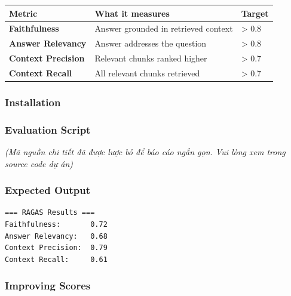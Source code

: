 \begingroup
\small
\setlength{\tabcolsep}{3pt}
\renewcommand{\arraystretch}{1.15}
\begin{longtable}[]{@{}lll@{}}
\toprule\noalign{}
Metric & What it measures & Target \\
\midrule\noalign{}
\endhead
\bottomrule\noalign{}
\endlastfoot
\textbf{Faithfulness} & Answer grounded in retrieved context &
\textgreater{} 0.8 \\
\textbf{Answer Relevancy} & Answer addresses the question &
\textgreater{} 0.8 \\
\textbf{Context Precision} & Relevant chunks ranked higher &
\textgreater{} 0.7 \\
\textbf{Context Recall} & All relevant chunks retrieved & \textgreater{}
0.7 \\
\end{longtable}
\endgroup

\hypertarget{installation}{%
\subsubsection{Installation}}

\begin{Shaded}
\begin{Highlighting}[]
\end{Highlighting}
\end{Shaded}

\hypertarget{evaluation-script}{%
\subsubsection{Evaluation Script}}

\emph{(Mã nguồn chi tiết đã được lược bỏ để báo cáo ngắn gọn. Vui lòng
xem trong source code dự án)}

\hypertarget{expected-output}{%
\subsubsection{Expected Output}}

\begin{verbatim}
=== RAGAS Results ===
Faithfulness:       0.72
Answer Relevancy:   0.68
Context Precision:  0.79
Context Recall:     0.61
\end{verbatim}

\hypertarget{improving-scores}{%
\subsubsection{Improving Scores}}


